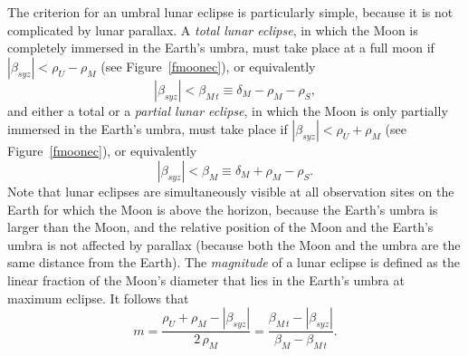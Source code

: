 The criterion for
an umbral lunar eclipse is particularly simple, because it is not
complicated by lunar parallax. A {\em total lunar eclipse}, in which the Moon is
completely immersed in the Earth's umbra, must take place at a
full moon if $|\beta_{syz}| < \rho_U-\rho_M$ (see Figure~\ref{fmoonec}),
or equivalently
\begin{equation}\label{elp}
|\beta_{syz}| < \beta_{M\,t}\equiv \delta_M-\rho_M-\rho_S,
\end{equation}
and either a total or a {\em partial lunar eclipse}, in which the Moon is only
partially immersed in the Earth's umbra, must take place if
$ |\beta_{syz}| < \rho_U+\rho_M$ (see Figure~\ref{fmoonec}),
or  equivalently
\begin{equation}\label{elt}
|\beta_{syz}| < \beta_M\equiv \delta_M+\rho_M-\rho_S.
\end{equation}
 Note that lunar eclipses are simultaneously
visible at all observation sites on the Earth for which the Moon is
above the horizon, because the Earth's umbra is larger than the Moon, and the relative position of the Moon and the Earth's umbra is not affected by parallax
(because both the Moon and the umbra are the same distance from the Earth). The {\em magnitude}\/ of a lunar eclipse is
defined as the linear fraction of the Moon's diameter that lies in the Earth's umbra at maximum eclipse. It follows
that
\begin{equation}
m = \frac{\rho_U+\rho_M-|\beta_{syz}|}{2\,\rho_M} = \frac{\beta_{M\,t}- |\beta_{syz}|}{\beta_M-\beta_{M\,t}}.
\end{equation}

